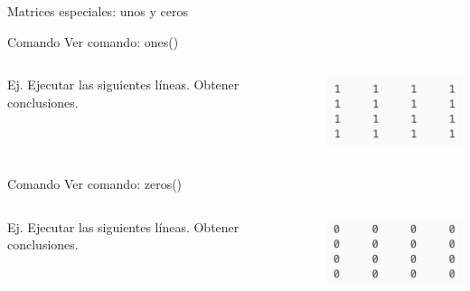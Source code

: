 \documentclass{bredelebeamer}
\begin{document}
\begin{frame}{Matrices especiales: unos y ceros}
\begin{exampleblock}{Comando}
Ver comando: ones()
\end{exampleblock}
\begin{columns}
\begin{column}{0.5\textwidth}
Ej. Ejecutar las siguientes líneas. Obtener conclusiones.

\end{column}
\begin{column}{0.5\textwidth}
\begin{center}
\includegraphics[scale=0.5]{images/pantalla1.png}
\end{center}
\end{column}
\end{columns}
\begin{exampleblock}{Comando}
Ver comando: zeros()
\end{exampleblock}
\begin{columns}
\begin{column}{0.5\textwidth}
Ej. Ejecutar las siguientes líneas. Obtener conclusiones.

\end{column}
\begin{column}{0.5\textwidth}
\begin{center}
\includegraphics[scale=0.5]{images/pantalla2.png}
\end{center}
\end{column}
\end{columns}
\end{frame}
\end{document}
